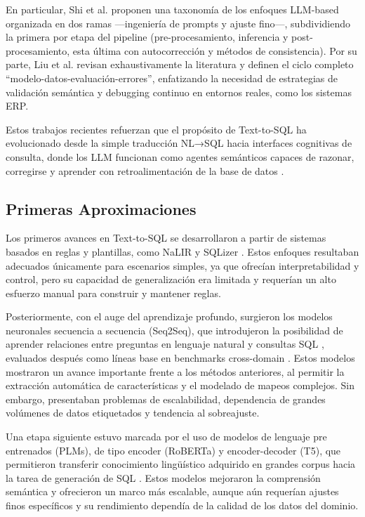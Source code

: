 \documentclass[journal]{IEEEtran}
\begin{document}
En particular, Shi et al. \cite{shi2025comprehensive} proponen una taxonomía de los enfoques LLM-based organizada en dos ramas —ingeniería de prompts y ajuste fino—, subdividiendo la primera por etapa del pipeline (pre-procesamiento, inferencia y post-procesamiento, esta última con autocorrección y métodos de consistencia). Por su parte, Liu et al. \cite{liu2025survey} revisan exhaustivamente la literatura y definen el ciclo completo ``modelo-datos-evaluación-errores'', enfatizando la necesidad de estrategias de validación semántica y debugging continuo en entornos reales, como los sistemas ERP.

Estos trabajos recientes refuerzan que el propósito de Text-to-SQL ha evolucionado desde la simple traducción NL→SQL hacia interfaces cognitivas de consulta, donde los LLM funcionan como agentes semánticos capaces de razonar, corregirse y aprender con retroalimentación de la base de datos \cite{hong2025advances}.

\subsection{Primeras Aproximaciones}

Los primeros avances en Text-to-SQL se desarrollaron a partir de sistemas basados en reglas y plantillas, como NaLIR \cite{li2014nalir} y SQLizer \cite{yaghmazadeh2017sqlizer}. Estos enfoques resultaban adecuados únicamente para escenarios simples, ya que ofrecían interpretabilidad y control, pero su capacidad de generalización era limitada y requerían un alto esfuerzo manual para construir y mantener reglas.

Posteriormente, con el auge del aprendizaje profundo, surgieron los modelos neuronales secuencia a secuencia (Seq2Seq), que introdujeron la posibilidad de aprender relaciones entre preguntas en lenguaje natural y consultas SQL \cite{dong2016language}, evaluados después como líneas base en benchmarks cross-domain \cite{yu2018spider}. Estos modelos mostraron un avance importante frente a los métodos anteriores, al permitir la extracción automática de características y el modelado de mapeos complejos. Sin embargo, presentaban problemas de escalabilidad, dependencia de grandes volúmenes de datos etiquetados y tendencia al sobreajuste.

Una etapa siguiente estuvo marcada por el uso de modelos de lenguaje pre entrenados (PLMs), de tipo encoder (RoBERTa) y encoder-decoder (T5), que permitieron transferir conocimiento lingüístico adquirido en grandes corpus hacia la tarea de generación de SQL \cite{scholak2021picard, li2023resdsql, rai2023improving}. Estos modelos mejoraron la comprensión semántica y ofrecieron un marco más escalable, aunque aún requerían ajustes finos específicos y su rendimiento dependía de la calidad de los datos del dominio.
\end{document}
